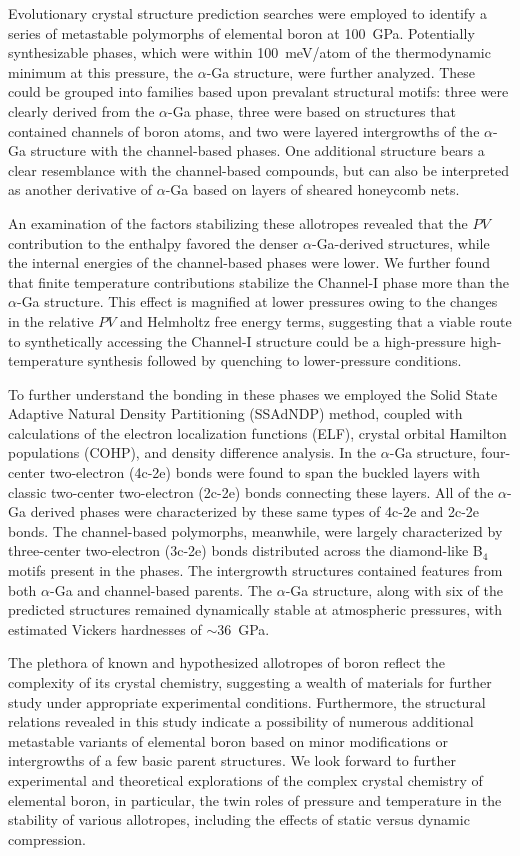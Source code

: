 \documentclass[reprint,aps,prl,twocolumn,letterpaper]{revtex4-2}
\begin{document}
Evolutionary crystal structure prediction searches were employed to identify a series of metastable polymorphs of elemental boron at 100~GPa. Potentially synthesizable phases, which were within 100~meV/atom of the thermodynamic minimum at this pressure, the $\alpha$-Ga structure, were further analyzed. These could be grouped into families based upon prevalant structural motifs: three were clearly derived from the $\alpha$-Ga phase, three were based on structures that contained channels of boron atoms, and two were layered intergrowths of the $\alpha$-Ga structure with the channel-based phases. One additional structure bears a clear resemblance with the channel-based compounds, but can also be interpreted as another derivative of $\alpha$-Ga based on layers of sheared honeycomb nets. 

An examination of the factors stabilizing these allotropes revealed that the $PV$ contribution to the enthalpy favored the denser $\alpha$-Ga-derived structures, while the internal energies of the channel-based phases were lower. We further found that finite temperature contributions stabilize the Channel-I phase more than the $\alpha$-Ga structure. This effect is magnified at lower pressures owing to the changes in the relative $PV$ and Helmholtz free energy terms, suggesting that a viable route to synthetically accessing the Channel-I structure could be a high-pressure high-temperature synthesis followed by quenching to lower-pressure conditions.

To further understand the bonding in these phases we employed the Solid State Adaptive Natural Density Partitioning (SSAdNDP) method, coupled with calculations of the electron localization functions (ELF), crystal orbital Hamilton populations (COHP), and density difference analysis. In the $\alpha$-Ga structure, four-center two-electron (4c-2e) bonds were found to span the buckled layers with classic two-center two-electron (2c-2e) bonds connecting these layers. All of the $\alpha$-Ga derived phases were characterized by these same types of 4c-2e and 2c-2e bonds. The channel-based polymorphs, meanwhile, were largely characterized by three-center two-electron (3c-2e) bonds distributed across the diamond-like B$_4$ motifs present in the phases. The intergrowth structures contained features from both $\alpha$-Ga and channel-based parents. The $\alpha$-Ga structure, along with six of the predicted structures remained dynamically stable at atmospheric pressures, with estimated Vickers hardnesses of $\sim$36~GPa.

The plethora of known and hypothesized allotropes of boron reflect the complexity of its crystal chemistry, suggesting a wealth of materials for further study under appropriate experimental conditions. Furthermore, the structural relations revealed in this study indicate a possibility of numerous additional metastable variants of elemental boron based on minor modifications or intergrowths of a few basic parent structures. We look forward to further experimental and theoretical explorations of the complex crystal chemistry of elemental boron, in particular, the twin roles of pressure and temperature in the stability of various allotropes, including the effects of static versus dynamic compression. 
\end{document}
